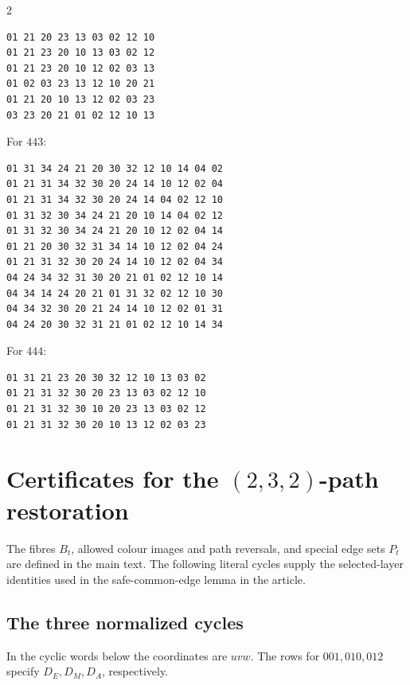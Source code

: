 \begin{multicols}{2}
\begin{minipage}{\linewidth}
\begin{verbatim}
01 21 20 23 13 03 02 12 10
01 21 23 20 10 13 03 02 12
01 21 23 20 10 12 02 03 13
01 02 03 23 13 12 10 20 21
01 21 20 10 13 12 02 03 23
03 23 20 21 01 02 12 10 13
\end{verbatim}
\end{minipage}\par\medskip
\noindent\begin{minipage}{\linewidth}
\noindent For $443$:
\begin{verbatim}
01 31 34 24 21 20 30 32 12 10 14 04 02
01 21 31 34 32 30 20 24 14 10 12 02 04
01 21 31 34 32 30 20 24 14 04 02 12 10
01 31 32 30 34 24 21 20 10 14 04 02 12
01 31 32 30 34 24 21 20 10 12 02 04 14
01 21 20 30 32 31 34 14 10 12 02 04 24
01 21 31 32 30 20 24 14 10 12 02 04 34
04 24 34 32 31 30 20 21 01 02 12 10 14
04 34 14 24 20 21 01 31 32 02 12 10 30
04 34 32 30 20 21 24 14 10 12 02 01 31
04 24 20 30 32 31 21 01 02 12 10 14 34
\end{verbatim}
\end{minipage}\par\medskip
\noindent\begin{minipage}{\linewidth}
\noindent For $444$:
\begin{verbatim}
01 31 21 23 20 30 32 12 10 13 03 02
01 21 31 32 30 20 23 13 03 02 12 10
01 21 31 32 30 10 20 23 13 03 02 12
01 21 31 32 30 20 10 13 12 02 03 23
\end{verbatim}
\end{minipage}\par\medskip

\end{multicols}

\section{Certificates for the \texorpdfstring{$(2,3,2)$}{(2,3,2)}-path restoration}
\label{app:path232-certificates}
The fibres $B_t$, allowed colour images and path reversals, and special
edge sets $P_t$ are defined in the main text. The following literal
cycles supply the selected-layer identities used in
the safe-common-edge lemma in the article.

\subsection{The three normalized cycles}
In the cyclic words below the coordinates are $uvw$. The rows for
$001,010,012$ specify $D_E,D_M,D_A$, respectively.

